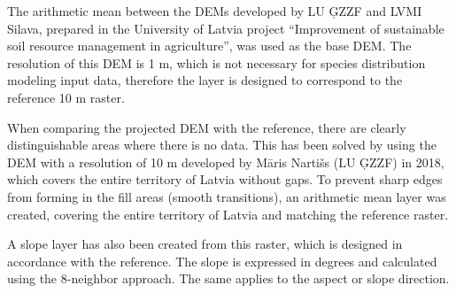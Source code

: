 \documentclass[
]{book}
\begin{document}
The arithmetic mean between the DEMs developed by LU ĢZZF and LVMI Silava,
prepared in the University of Latvia project ``Improvement of sustainable soil resource management
in agriculture'', was used as the base DEM. The resolution of this DEM is 1 m,
which is not necessary for species distribution modeling input data, therefore
the layer is designed to correspond to the reference 10 m raster.

When comparing the projected DEM with the reference, there are clearly
distinguishable areas where there is no data. This has been solved by using
the DEM with a resolution of 10 m developed by Māris Nartišs (LU ĢZZF) in 2018,
which covers the entire territory of Latvia without gaps. To prevent sharp
edges from forming in the fill areas (smooth transitions), an arithmetic mean
layer was created, covering the entire territory of Latvia and matching the
reference raster.

A slope layer has also been created from this raster, which is designed in
accordance with the reference. The slope is expressed in degrees and calculated
using the 8-neighbor approach. The same applies to the aspect or slope
direction.
\end{document}
